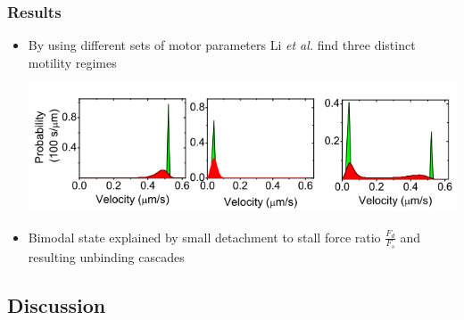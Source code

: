 \documentclass[11pt]{beamer}
\begin{document}
\begin{frame}
  \frametitle{Results}
  \begin{itemize}
  \item
    By using different sets of motor parameters Li \textit{et al.} find three distinct motility regimes\\
    \begin{center}
      \includegraphics[scale=0.55]{img/li-velocity-distribution.png}
    \end{center}
    \pause
  \item
    Bimodal state explained by small detachment to stall force ratio $\frac{F_d}{F_s}$ and resulting unbinding cascades
  \end{itemize}
\end{frame}

\subsection{Discussion}
\end{document}
